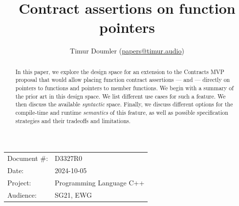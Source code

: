 

 \usepackage[bottom]{footmisc} 

 \usepackage{longtable}


\usepackage{tikz,lipsum,lmodern}
\usepackage[most]{tcolorbox}



\usepackage{titlesec}
\usepackage{tocloft}


\newcommand{\changelocaltocdepth}[1]{%
  \addtocontents{toc}{\protect\setcounter{tocdepth}{#1}}%
  \setcounter{tocdepth}{#1}%
}

\setcounter{tocdepth}{3}



\title{Contract assertions on function pointers}
\author{ Timur Doumler \small(\href{mailto:papers@timur.audio}{papers@timur.audio}) 
}
\date{}
\maketitle

\begin{tabular}{ll}
Document \#: & D3327R0 \\
Date: &2024-10-05 \\
Project: & Programming Language C++ \\
Audience: & SG21, EWG
\end{tabular}

\begin{abstract}
In this paper, we explore the design space for an extension to the Contracts MVP proposal \cite{P2900R8} that would allow placing function contract assertions ---  and  --- directly on pointers to functions and pointers to member functions. We begin  with a summary of the prior art in this design space. We list different use cases for such a feature. We then discuss the available \emph{syntactic} space. Finally, we discuss different  options for the compile-time and runtime \emph{semantics} of this feature, as well as possible specification strategies and their tradeoffs and limitations.
\end{abstract}


